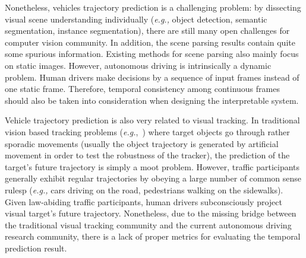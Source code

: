 \documentclass[10pt,twocolumn,letterpaper]{article}
\begin{document}

Nonetheless, vehicles trajectory prediction is a challenging problem: by dissecting visual scene understanding individually (\emph{e.g.,} object detection, semantic segmentation, instance segmentation),  there are still many open challenges for computer vision community.
In addition, the scene parsing results contain quite some spurious information.
Existing methods for scene parsing also mainly focus on static images.
However, autonomous driving is intrinsically a dynamic problem. Human drivers make decisions by a sequence of input frames instead of one static frame.
Therefore, temporal consistency among continuous frames should also be taken into consideration when designing the interpretable system.



Vehicle trajectory prediction is also very related to visual tracking.
In traditional vision based tracking problems (\emph{e.g.},~\cite{wu2015object, mueller2016benchmark}) where target objects go through rather sporadic movements (usually the object trajectory is generated by artificial movement in order to test the robustness of the tracker), the prediction of the target's future trajectory is simply a moot problem.
However, traffic participants generally exhibit regular trajectories by obeying a large number of common sense rulesp (\emph{e.g.,} cars driving on the road, pedestrians walking on the sidewalks). Given law-abiding traffic participants, human drivers subconsciously project visual target's future trajectory.
Nonetheless, due to the missing bridge between the traditional visual tracking community and the current autonomous driving research community, there is a lack of proper metrics for evaluating the temporal prediction result.


\end{document}
